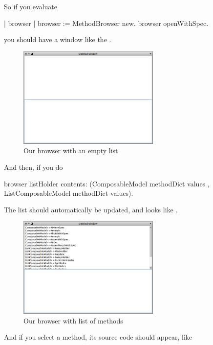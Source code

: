 \documentclass[a4paper,10pt,twoside]{book}
\begin{document}
So if you evaluate
\begin{code}{}
| browser |
browser := MethodBrowser new.
browser openWithSpec.
\end{code}
you should have a window like the .

\begin{figure}[ht]
\begin{center}
	\includegraphics[width=7cm]{MethodBrowser1}
	\caption{Our browser with an empty list}
\end{center}
\end{figure}

And then, if you do
\begin{code}{}
browser  listHolder contents: (ComposableModel methodDict values , ListComposableModel methodDict values).
\end{code}
The list should automatically be updated, and looks like .
\begin{figure}[ht]
\begin{center}
	\includegraphics[width=7cm]{MethodBrowser2}
	\caption{Our browser with list of methods}
\end{center}
\end{figure}

\newpage
And if you select a method, its source code should appear, like 
\end{document}
